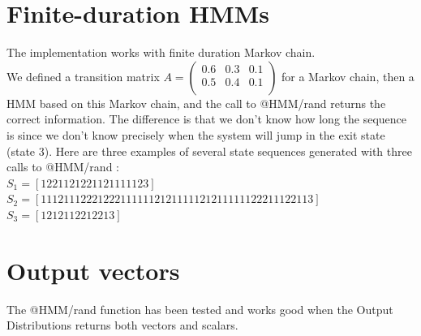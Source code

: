 \documentclass[a4paper]{report}
\begin{document}
\section{Finite-duration HMMs}
The implementation works with finite duration Markov chain.\\
We defined a transition matrix $A = \begin{pmatrix}
  0.6 & 0.3 & 0.1\\
  0.5 & 0.4 & 0.1\\
\end{pmatrix}$ for a Markov chain, then a HMM based on this Markov chain, and the call to @HMM/rand returns the correct information. The difference is that we don't know how long the sequence is since we don't know precisely when the system will jump in the exit state (state 3).
Here are three examples of several state sequences generated with three calls to @HMM/rand :\\
$S_1 =[ 1	2	2	1	1	2	1	2	2	1	1	2	1	1	1	1	1	2 3]$\\
$S_2 = [1	1	1	2	1	1	1	2	2	2	1	2	2	2	1	1	1	1	1	1	2	1	2	1	1	1	1	1	2	1	2	1	1	1	1	1	1	2	2	2	1	1	1	2	2	1	1 3]$\\
$S_3 = [1	2	1	2	1	1	2	2	1	2	2	1 3]$\\

\section{Output vectors}
The @HMM/rand function has been tested and works good when the Output Distributions returns both vectors and scalars.
\end{document}
